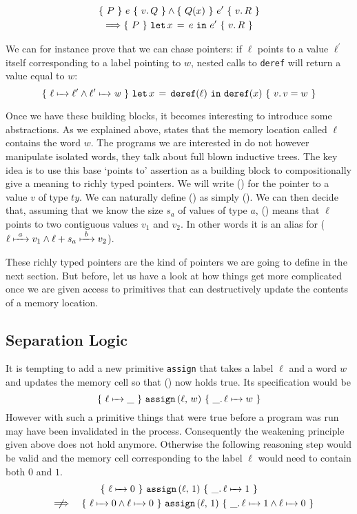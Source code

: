 \begin{gather*}
  \lbrace~ P ~\rbrace~ e ~\lbrace~ v.\, Q ~\rbrace \wedge \lbrace~ Q(x) ~\rbrace~ e^{\prime} ~\lbrace~ v.\, R ~\rbrace \\
  \Longrightarrow \lbrace~ P ~\rbrace~ \texttt{let}\,x\,=\,e~\texttt{in}~e^{\prime} ~\lbrace~ v.\, R ~\rbrace
\end{gather*}

We can for instance prove that we can chase pointers:
if $\ell$ points to a value $\ell^{\prime}$ itself corresponding
to a label pointing to $w$, nested calls to \texttt{deref}
will return a value equal to $w$:
\[ \lbrace~ \ell \xmapsto{~~} \mathit{\ell^{\prime}} \wedge \ell^{\prime} \xmapsto{~~} \mathit{w} ~\rbrace~ \texttt{let}\,x\,=\,\texttt{deref}(\ell)~\texttt{in}~\texttt{deref}(x) ~\lbrace~ v.\, v = w ~\rbrace
\]

Once we have these building blocks, it becomes interesting to introduce
some abstractions. As we explained above,  states that
the memory location called $\ell$ contains the word $w$.
%
The programs we are interested in do not however manipulate isolated words,
they talk about full blown inductive trees.
%
The key idea is to use this base `points to' assertion as a building
block to compositionally give a meaning to richly typed pointers.
We will write () for the pointer
to a value $v$ of type $\mathit{ty}$.
%
We can naturally define () as
simply ().
%
We can then decide that, assuming that we know the size $s_a$
of values of type $a$, ()
means that $\ell$ points to two contiguous values $v_1$ and $v_2$.
%
In other words it is an alias for
($\ell \xmapsto{~a~} v_1 \wedge \ell+s_a \xmapsto{~b~} v_2$).


These richly typed pointers are the kind of pointers we are going to
define in the next section.
%
But before, let us have a look at how things get more complicated
once we are given access to primitives that can destructively update
the contents of a memory location.

\subsection{Separation Logic}

It is tempting to add a new primitive \texttt{assign} that takes a
label $\ell$ and a word $w$ and updates the memory cell so that
() now holds true. Its specification would be
\[ \lbrace~ \ell \xmapsto{~~} \_ ~\rbrace~ \texttt{assign}\,(\ell,\,w) ~\lbrace~ \_.\, \ell \xmapsto{~~} w ~\rbrace \]
However with such a primitive things that were true before a program
was run may have been invalidated in the process.
%
Consequently the weakening principle given above does not hold anymore.
Otherwise the following reasoning step would be valid and the memory cell
corresponding to the label $\ell$ would need to contain both $0$ and $1$.
\begin{gather*}
  \Hoare{\Pointer{\ell}{}{0}}{\texttt{assign}\,(\ell,\,1)}{\_}{\Pointer{\ell}{}{1}}
  \\\quad \centernot\Longrightarrow \quad
   \Hoare{\Pointer{\ell}{}{0} \wedge \Pointer{\ell}{}{0}}{\texttt{assign}\,(\ell,\,1)}{\_}{\Pointer{\ell}{}{1} \wedge \Pointer{\ell}{}{0}}
\end{gather*}

